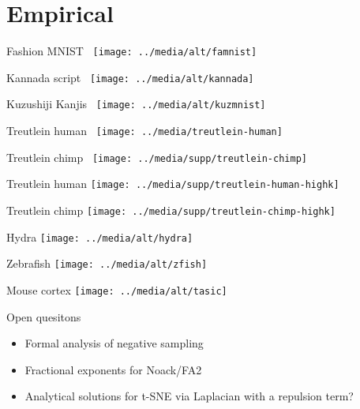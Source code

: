 \documentclass{beamer}
\begin{document}
\section*{Empirical}
\begin{frame}{Fashion MNIST~\citep{xiao2017fashion}}
  \texttt{[image: ../media/alt/famnist]}
\end{frame}
\begin{frame}{Kannada script~\citep{prabhu2019kannada}}
  \texttt{[image: ../media/alt/kannada]}
\end{frame}
\begin{frame}{Kuzushiji Kanjis~\citep{clanuwat2018kuzmnist}}
  \texttt{[image: ../media/alt/kuzmnist]}
\end{frame}
\begin{frame}{Treutlein human~\citep{kanton2019organoid}}
  \texttt{[image: ../media/treutlein-human]}
\end{frame}
\begin{frame}{Treutlein chimp~\citep{kanton2019organoid}}
  \texttt{[image: ../media/supp/treutlein-chimp]}
\end{frame}
\begin{frame}{Treutlein human \citep{kanton2019organoid}}
  \texttt{[image: ../media/supp/treutlein-human-highk]}
\end{frame}
\begin{frame}{Treutlein chimp\citep{kanton2019organoid}}
  \texttt{[image: ../media/supp/treutlein-chimp-highk]}
\end{frame}
\begin{frame}{Hydra \citep{siebert19hydra}}
  \texttt{[image: ../media/alt/hydra]}
\end{frame}
\begin{frame}{Zebrafish \citep{wagner2018zfish}}
  \texttt{[image: ../media/alt/zfish]}
\end{frame}
\begin{frame}{Mouse cortex \citep{tasic2018shared}}
  \texttt{[image: ../media/alt/tasic]}
\end{frame}

\begin{frame}{Open quesitons}
  \begin{itemize}
  \item Formal analysis of negative sampling
  \item Fractional exponents for Noack/FA2
  \item Analytical solutions for t-SNE via Laplacian with a repulsion
    term?
  \end{itemize}
\end{frame}

\begin{frame}{}
  \tiny
  
  
\end{frame}
\end{document}
